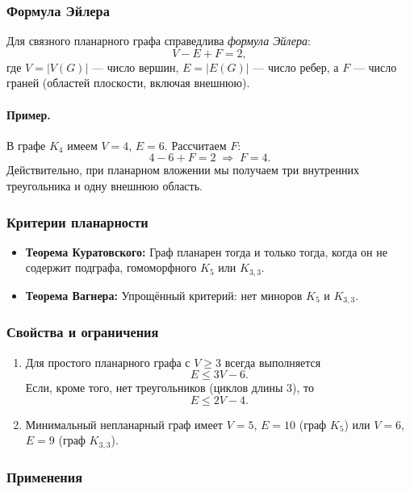 \subsubsection{Формула Эйлера}

Для связного планарного графа справедлива \emph{формула Эйлера}:
\[
  V - E + F = 2,
\]
где $V = |V(G)|$ — число вершин, $E = |E(G)|$ — число ребер, а $F$ — число граней (областей плоскости, включая внешнюю).

\paragraph{Пример.} В графе $K_4$ имеем $V=4$, $E=6$. Рассчитаем $F$:
\[
  4 - 6 + F = 2 \;\Longrightarrow\; F = 4.
\]
Действительно, при планарном вложении мы получаем три внутренних треугольника и одну внешнюю область.

\subsubsection{Критерии планарности}

\begin{itemize}[leftmargin=*]
  \item \textbf{Теорема Куратовского:} Граф планарен тогда и только тогда, когда он не содержит подграфа, гомоморфного $K_5$ или $K_{3,3}$.
  \item \textbf{Теорема Вагнера:} Упрощённый критерий: нет миноров $K_5$ и $K_{3,3}$.
\end{itemize}

\subsubsection{Свойства и ограничения}

\begin{enumerate}[label=\arabic*)]
  \item Для простого планарного графа с $V\ge3$ всегда выполняется
  \[
    E \le 3V - 6.
  \]
  Если, кроме того, нет треугольников (циклов длины 3), то
  \[
    E \le 2V - 4.
  \]
  \item Минимальный непланарный граф имеет $V=5$, $E=10$ (граф $K_5$) или $V=6$, $E=9$ (граф $K_{3,3}$).
\end{enumerate}

\subsubsection{Применения}

